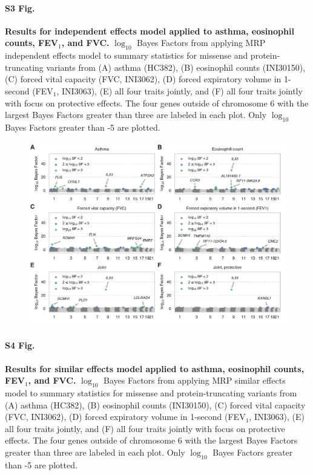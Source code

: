 \paragraph*{S3 Fig.}
\label{asthma_independent}
{\bf Results for independent effects model applied to asthma, eosinophil counts, FEV$_1$, and FVC.} $\log_{10}$ Bayes Factors from applying MRP independent effects model to summary statistics for missense and protein-truncating variants from (A) asthma (HC382), (B) eosinophil counts (INI30150), (C) forced vital capacity (FVC, INI3062), (D) forced expiratory volume in 1-second (FEV$_1$, INI3063), (E) all four traits jointly, and (F) all four traits jointly with focus on protective effects. The four genes outside of chromosome 6 with the largest Bayes Factors greater than three are labeled in each plot. Only $\log_{10}$ Bayes Factors greater than -5 are plotted.

\begin{figure}[H]
\includegraphics[width=\textwidth]{../figures/final/Figure_S04.pdf}
\end{figure}
\paragraph*{S4 Fig.}
\label{asthma_similar}
{\bf Results for similar effects model applied to asthma, eosinophil counts, FEV$_1$, and FVC.} $\log_{10}$ Bayes Factors from applying MRP similar effects model to summary statistics for missense and protein-truncating variants from (A) asthma (HC382), (B) eosinophil counts (INI30150), (C) forced vital capacity (FVC, INI3062), (D) forced expiratory volume in 1-second (FEV$_1$, INI3063), (E) all four traits jointly, and (F) all four traits jointly with focus on protective effects. The four genes outside of chromosome 6 with the largest Bayes Factors greater than three are labeled in each plot. Only $\log_{10}$ Bayes Factors greater than -5 are plotted.

